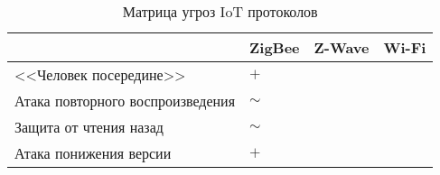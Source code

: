	\begin{table}[h]
		\centering
		\begin{tabular}{ | l | l | l | l | }
			\hline
			& ZigBee & Z-Wave & Wi-Fi \\ \hline
			<<Человек посередине>> & $+$ &  &  \\ \hline
			Атака повторного воспроизведения & $\sim$ & &  \\ \hline
			Защита от чтения назад & $\sim$ &  &  \\ \hline
			Атака понижения версии & $+$ &  &  \\
			\hline
		\end{tabular}
		\caption{Матрица угроз IoT протоколов}
		\label{table-threat-matrix}
	\end{table}
	